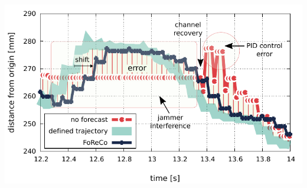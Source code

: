 \documentclass[a0,portrait]{a0poster}
\begin{document}
\begin{multicols}{2}
\begin{center}\vspace{1cm}
    \includegraphics[width=.79\linewidth]{figures/foreco-experim-out-xyz-zoomed.pdf}
    \label{fig:jammer-trajectories}
\end{center}\vspace{1cm}




\color{DarkSlateGray} %



\printbibliography






\end{multicols}
\end{document}
